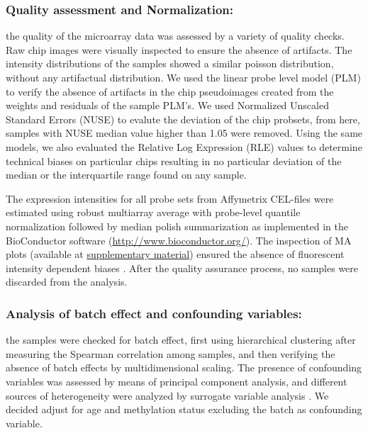 \documentclass[9pt,twocolumn,twoside]{gsajnl}
\begin{document}
\subsubsection*{Quality assessment and Normalization:}
the quality of the microarray data was assessed by a variety of quality checks. Raw chip images were visually inspected to ensure the absence of  artifacts. The intensity distributions of the samples showed a similar poisson distribution, without any artifactual distribution. We used the linear probe level model (PLM) \citep{Bolstad2004, Brettschneider2007} to verify the absence of artifacts in the chip pseudoimages created from the weights and residuals of the sample PLM's. We used Normalized Unscaled Standard Errors (NUSE) \citep{Bolstad2004} to evalute the deviation of the chip probsets, from here, samples with NUSE median value higher than 1.05 were removed. Using the same models, we also evaluated the Relative Log Expression (RLE) values \citep{Bolstad2004, Brettschneider2007} to determine technical biases on particular chips resulting in no particular deviation of the median or the interquartile range found on any sample.

The expression intensities for all probe sets from Affymetrix CEL-files were estimated using robust multiarray average with probe-level quantile normalization followed by median polish summarization \citep{Irizarry2003} as implemented in the BioConductor software (\url{http://www.bioconductor.org/}). The inspection of MA plots (available at \href{http://ieoproject.tk/ieo/abella_casals_miravet.html}{supplementary material}) ensured the absence of fluorescent intensity dependent biases \citep{Bolstad2004}. After the quality assurance process, no samples were discarded from the analysis.

\subsubsection*{Analysis of batch effect and confounding variables:}
the samples were checked for batch effect, first using hierarchical clustering after measuring the Spearman correlation among samples, and then verifying the absence of batch effects by multidimensional scaling. The presence of confounding variables was assessed by means of principal component analysis, and different sources of heterogeneity were analyzed by surrogate variable analysis \citep{Leek2007}. We decided adjust for age and methylation status \citep{Qiu2014} excluding the batch as confounding variable. 
\end{document}

